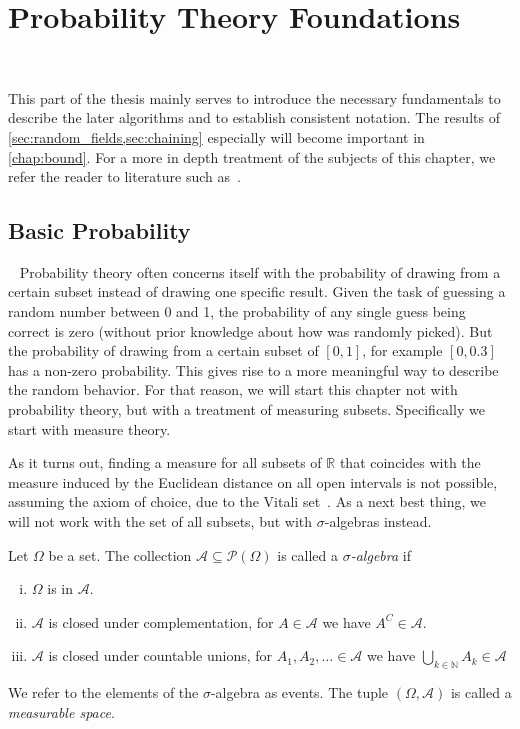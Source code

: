 \chapter{Probability Theory Foundations}~\label{chap:foundations}

This part of the thesis mainly serves to introduce the necessary fundamentals to describe the later algorithms and to establish  consistent notation.
The results of \cref{sec:random_fields,sec:chaining} especially will become important in \cref{chap:bound}.
For a more in depth treatment of the subjects of this chapter, we refer the reader to literature such as~\cite{bremaud2020probability,bovier2022stochastic}.

\section{Basic Probability}~\label{sec:basics}
% 
Probability theory often concerns itself with the probability of drawing from a certain subset instead of drawing one specific result.
Given the task of guessing a random number between 0 and 1, the probability of any single guess being correct is zero (without prior knowledge about how was randomly picked). 
But the probability of drawing from a certain subset of \( [0,1] \), for example \([0,0.3]\) has a non-zero probability. This gives rise to a more meaningful way to describe the random behavior.
For that reason, we will start this chapter not with probability theory, but with a treatment of measuring subsets. Specifically we start with measure theory.

As it turns out, finding a measure for all subsets of $\mathbb{R}$ that coincides with the measure induced by the Euclidean distance on all open intervals is not possible, assuming the axiom of choice, due to the Vitali set~\cite{vitali1905sul}. As a next best thing, we will not work with the set of all subsets, but with $\sigma$-algebras instead.


\begin{definition}
    Let $\Omega$ be a set. The collection \( \mathcal{A} \subseteq \mathcal{P} (\Omega) \) is called a \textit{$\sigma$-algebra} if
    \begin{enumerate}[(i)]
        \item $\Omega$ is in $\mathcal{A}$.
        \item $\mathcal{A}$ is closed under complementation, for \( A \in \mathcal{A} \) we have \( A^{C} \in \mathcal{A} \).
        \item $\mathcal{A}$ is closed under countable unions, for \( A_{1}, A_{2}, \dots \in \mathcal{A} \) we have \( \bigcup_{k \in \mathbb{N}} A_{k} \in \mathcal{A} \)
    \end{enumerate}
    We refer to the elements of the $\sigma$-algebra as events. The tuple \( (\Omega,\mathcal{A})\) is called a \textit{measurable space}. 
\end{definition}


